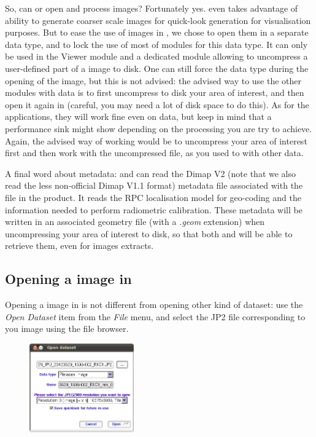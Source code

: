 So, can \mont or \app open and process \phr images? Fortunately
yes. \mont even takes advantage of \jpg ability to generate coarser
scale images for quick-look generation for visualisation purposes. But
to ease the use of \phr images in \mont, we chose to open them in a
separate data type, and to lock the use of most of modules for this
data type. It can only be used in the Viewer module and a dedicated
module allowing to uncompress a user-defined part of a
\phr image to disk. One can still force the data type during the
opening of the image, but this is not advised: the advised way to use
the other modules with \phr data is to first uncompress to disk
your area of interest, and then open it again in \mont (careful,
you may need a lot of disk space to do this). As for the applications,
they will work fine even on \jpg \phr data, but keep in mind
that a performance sink might show depending on the processing you are
try to achieve. Again, the advised way of working would be to
uncompress your area of interest first and then work with the
uncompressed file, as you used to with other data.

A final word about metadata: \app and \mont can read the Dimap V2
(note that we also read the less non-official Dimap V1.1 format)
metadata file associated with the \jpg file in the \phr
product. It reads the RPC localisation model for geo-coding and the
information needed to perform radiometric calibration. These metadata
will be written in an associated geometry file (with a \textit{.geom}
extension) when uncompressing your area of interest to disk, so that
both \mont and \app will be able to retrieve them, even for images
extracts.

\subsection{Opening a \phr image in \mont}\label{sec:mvd_phr_open}

Opening a \phr image in \mont is not different from opening other
kind of dataset: use the \textit{Open Dataset} item from the
\textit{File} menu, and select the JP2 file corresponding to you image
using the file browser.

\begin{figure}
  \center
  \includegraphics[width=0.4\textwidth]{../Art/MonteverdiImages/pleiades_open.png}
  \label{fig:pleiades_open}
\end{figure}

